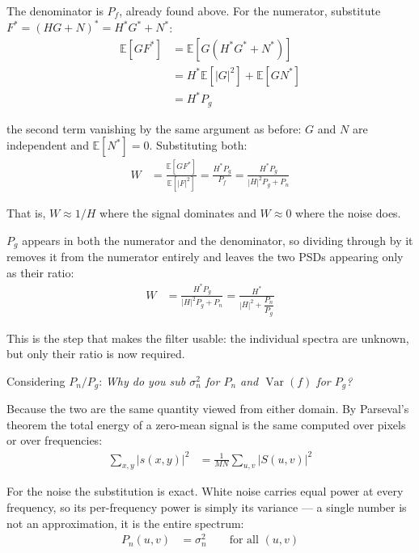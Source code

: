 \documentclass[10pt,twocolumn,letterpaper]{article}
\begin{document}
\noindent The denominator is $P_{f}$, already found above. For the numerator, substitute
$F^{*} = \left(H G + N\right)^{*} = H^{*} G^{*} + N^{*}$:
\begin{align}
  \mathbb{E}\!\left[G F^{*}\right]
    &= \mathbb{E}\!\left[G \left(H^{*} G^{*} + N^{*}\right)\right] \nonumber \\
    &= H^{*} \mathbb{E}\!\left[\left|G\right|^{2}\right]
       + \mathbb{E}\!\left[G N^{*}\right] \nonumber \\
    &= H^{*} P_{g}
\end{align}

\noindent the second term vanishing by the same argument as before: $G$ and $N$ are
independent and $\mathbb{E}\!\left[N^{*}\right] = 0$. Substituting both:
\begin{align}
  W &= \frac{\mathbb{E}\!\left[G F^{*}\right]}{\mathbb{E}\!\left[\left|F\right|^{2}\right]}
     = \frac{H^{*} P_{g}}{P_{f}}
     = \frac{H^{*} P_{g}}{\left|H\right|^{2} P_{g} + P_{n}}
\end{align}

\noindent That is, $W \approx 1/H$ where the signal dominates and $W \approx 0$ where the
noise does.

\noindent $P_{g}$ appears in both the numerator and the denominator, so dividing through by
it removes it from the numerator entirely and leaves the two PSDs appearing only as their
ratio:
\begin{align}
  W &= \frac{H^{*} P_{g}}{\left|H\right|^{2} P_{g} + P_{n}}
     = \frac{H^{*}}{\left|H\right|^{2} + \dfrac{P_{n}}{P_{g}}}
\end{align}

\noindent This is the step that makes the filter usable: the individual spectra are
unknown, but only their ratio is now required.

\medskip

\noindent Considering $P_{n} / P_{g}$: \emph{Why do you sub $\sigma_{n}^{2}$ for $P_{n}$ and $\operatorname{Var}(f)$ for
$P_{g}$?}

\medskip

\noindent Because the two are the same quantity viewed from either domain. By Parseval's
theorem the total energy of a zero-mean signal is the same computed over pixels or over
frequencies:
\begin{align}
  \sum_{x,y} \left|s(x,y)\right|^{2}
    &= \frac{1}{MN} \sum_{u,v} \left|S(u,v)\right|^{2}
\end{align}

\noindent For the noise the substitution is exact. White noise carries equal power at every
frequency, so its per-frequency power is simply its variance --- a single number is not an
approximation, it is the entire spectrum:
\begin{align}
  P_{n}(u,v) &= \sigma_{n}^{2} \qquad \text{for all } (u,v)
\end{align}
\end{document}
